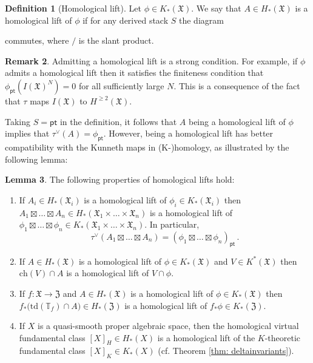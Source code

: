 \documentclass[12pt]{amsart}
\theoremstyle{definition}
\newtheorem{definition}{Definition}[section]
\newtheorem{lemma}[definition]{Lemma}
\newtheorem{remark}[definition]{Remark}
\newcommand{\BT}{{\mathbb{T}}}
\newcommand{\1}{\mathbf 1}
\newcommand{\FX}{{\mathfrak{X}}}
\newcommand{\FY}{\mathfrak{Z}}
\newcommand{\pt}{{\mathsf{pt}}}
\newcommand{\ch}{\mathrm{ch}}
\newcommand{\td}{\mathrm{td}}
\begin{document}
\begin{definition}[Homological lift]\label{def: homlift}
    Let $\phi\in K_\ast(\FX)$. We say that $A\in H_\ast(\FX)$ is a homological lift of $\phi$ if for any derived stack $S$ the diagram
    \begin{center}
    \end{center}
            commutes, where $\slash$ is the slant product.
\end{definition}
\begin{remark}\label{rmk: homliftfiniteness}
Admitting a homological lift is a strong condition. For example, if $\phi$ admits a homological lift then it satisfies the finiteness condition that $\phi_\pt(I(\FX)^N)=0$ for all sufficiently large $N$. This is a consequence of the fact that $\tau$ maps $I(\FX)$ to $H^{\geq 2}(\FX)$. 
\end{remark}
Taking $S=\pt$ in the definition, it follows that $A$ being a homological lift of $\phi$ implies that $\tau^\vee(A)=\phi_\pt$. However, being a homological lift has better compatibility with the Kunneth maps in (K-)homology, as illustrated by the following lemma:
\begin{lemma}\label{lem: homlift}The following properties of homological lifts hold:
\begin{enumerate}
    \item If $A_i\in H_\ast(\FX_i)$ is a homological lift of $\phi_i\in K_\ast(\FX_i)$ then $A_1\boxtimes \ldots\boxtimes A_n\in H_\ast(\FX_1\times \ldots\times \FX_n)$ is a homological lift of $\phi_1\boxtimes \ldots\boxtimes \phi_n\in K_\ast(\FX_1\times \ldots\times \FX_n)$. In particular,
    \[\tau^\vee(A_1\boxtimes \ldots\boxtimes A_n)=(\phi_1\boxtimes \ldots\boxtimes \phi_n)_\pt\,.\]
    \item If $A\in H_\ast(\FX)$ is a homological lift of $\phi\in K_\ast(\FX)$ and $V\in K^\ast(\FX)$ then $\ch(V)\cap A$ is a homological lift of $V\cap \phi$.
    \item If $f\colon \FX\to \FY$ and $A\in H_\ast(\FX)$ is a homological lift of $\phi\in K_\ast(\FX)$ then $f_\ast\big(\td(\BT_f)\cap A)\in H_\ast(\FY)$ is a homological lift of $f_\ast\phi\in K_\ast(\FY)$. 
    \item If $X$ is a quasi-smooth proper algebraic space, then the homological virtual fundamental class $[X]_H\in H_\ast(X)$ is a homological lift of the $K$-theoretic fundamental class $[X]_K\in K_\ast(X)$ (cf. Theorem \ref{thm: deltainvariants}).
\end{enumerate}
\end{lemma}
\end{document}
